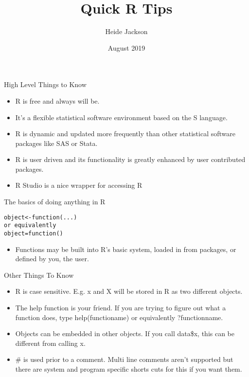 \documentclass{beamer}
\title{Quick R Tips}
\author{Heide Jackson }
\date{August 2019}
\begin{document}
\maketitle

\begin{frame}{High Level Things to Know}
\begin{itemize}
\item R is free and always will be.
\item It's a flexible statistical software environment based on the S language.
\item R is dynamic and updated more frequently than other statistical software packages like SAS or Stata.
\item R is user driven and its functionality is greatly enhanced by user contributed packages.
\item R Studio is a nice wrapper for accessing R
\end{itemize}
\end{frame}

\begin{frame}[fragile]{The basics of doing anything in R}
\begin{verbatim}
object<-function(...)
or equivalently
object=function()
\end{verbatim}
\begin{itemize}
    \item Functions may be built into R's basic system, loaded in from packages, or defined by you, the user.
\end{itemize}
\end{frame}

\begin{frame}{Other Things To Know}
\begin{itemize}
    \item R is case sensitive. E.g. x and X will be stored in R as two different objects.
    \item The help function is your friend.  If you are trying to figure out what a function does, type help(functioname) or equivalently ?functionname.
    \item Objects can be embedded in other objects.  If you call data\$x, this can be different from calling x.
   \item \# is used prior to a comment.  Multi line comments aren't supported but there are system and program specific shorts cuts for this if you want them.
    \end{itemize}
    \end{frame}
\end{document}
